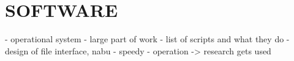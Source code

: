 \chapter{SOFTWARE}

- operational system
- large part of work
- list of scripts and what they do
- design of file interface, nabu
- speedy
- operation -> research gets used

